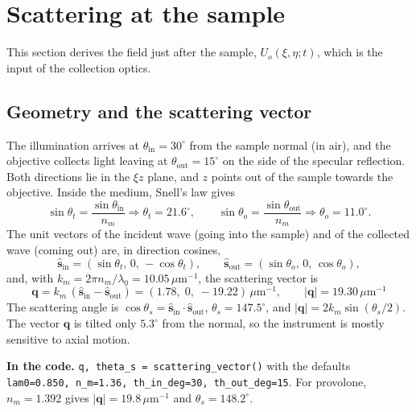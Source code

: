 \documentclass[11pt,a4paper]{article}
\newcommand{\vq}{\mathbf{q}}
\newcommand{\shat}{\hat{\mathbf{s}}}
\newcommand{\um}{\,\mu\mathrm{m}}
\newcommand{\code}[1]{\texttt{\small #1}}
\newcommand{\incode}[1]{\par\smallskip\noindent\colorbox{black!6}{\parbox{\dimexpr\linewidth-2\fboxsep}{\small\textbf{In the code.} #1}}\par\smallskip}
\begin{document}
\section{Scattering at the sample}
\label{sec:scatter}

This section derives the field just after the sample, $U_o(\xi,\eta;t)$,
which is the input of the collection optics.

\subsection{Geometry and the scattering vector}
\label{sec:q}

The illumination arrives at $\theta_\mathrm{in} = 30^\circ$ from the sample
normal (in air), and the objective collects light leaving at
$\theta_\mathrm{out} = 15^\circ$ on the side of the specular reflection. Both
directions lie in the $\xi z$ plane, and $z$ points out of the sample towards
the objective. Inside the medium, Snell's law gives
\begin{equation}
  \sin\theta_t = \frac{\sin\theta_\mathrm{in}}{n_m} \Rightarrow \theta_t = 21.6^\circ,
  \qquad
  \sin\theta_o = \frac{\sin\theta_\mathrm{out}}{n_m} \Rightarrow \theta_o = 11.0^\circ .
\end{equation}
The unit vectors of the incident wave (going into the sample) and of the
collected wave (coming out) are, in direction cosines,
\begin{equation}
  \shat_\mathrm{in} = (\sin\theta_t,\,0,\,-\cos\theta_t),\qquad
  \shat_\mathrm{out} = (\sin\theta_o,\,0,\,\cos\theta_o),
\end{equation}
and, with $k_m = 2\pi n_m/\lambda_0 = 10.05\um^{-1}$, the scattering vector is
\begin{equation}
  \boxed{\;\vq = k_m\,(\shat_\mathrm{in} - \shat_\mathrm{out})
  = (1.78,\;0,\;-19.22)\um^{-1},\qquad |\vq| = 19.30\um^{-1}\;}
  \label{eq:q}
\end{equation}
The scattering angle is $\cos\theta_s = \shat_\mathrm{in}\cdot\shat_\mathrm{out}$,
$\theta_s = 147.5^\circ$, and $|\vq| = 2k_m\sin(\theta_s/2)$. The vector $\vq$
is tilted only $5.3^\circ$ from the normal, so the instrument is mostly
sensitive to axial motion.

\incode{\code{q, theta\_s = scattering\_vector()} with the defaults
\code{lam0=0.850, n\_m=1.36, th\_in\_deg=30, th\_out\_deg=15}. For provolone,
$n_m = 1.392$ gives $|\vq| = 19.8\um^{-1}$ and $\theta_s = 148.2^\circ$.}
\end{document}
